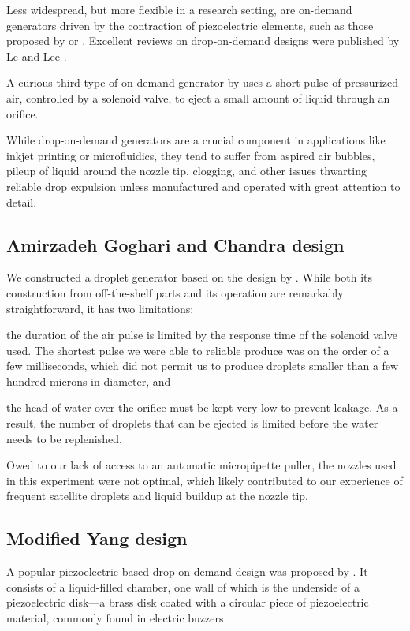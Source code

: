 \documentclass[11.5pt]{book}
\begin{document}
Less widespread, but more flexible in a research setting, are on-demand
generators driven by the contraction of piezoelectric elements, such as those
proposed by \citet{Yang97} or \citet{Ulmke99}. Excellent reviews on
drop-on-demand designs were published by Le and Lee \cite{Le98, Lee02}. 

A curious third type of on-demand generator by \citet{Goghari08} uses a short
pulse of pressurized air, controlled by a solenoid valve, to eject a small
amount of liquid through an orifice.

While drop-on-demand generators are a crucial component in applications like inkjet
printing or microfluidics, they tend to suffer from aspired air bubbles, pileup
of liquid around the nozzle tip, clogging, and other issues thwarting reliable
drop expulsion unless manufactured and operated with great attention to detail.

\subsection{Amirzadeh Goghari and Chandra design}
We constructed a droplet generator based on the design by \citet{Goghari08}.
While both its construction from off-the-shelf parts and its operation are
remarkably straightforward, it has two limitations:

\begin{alist}
    \item the duration of the air pulse is limited by the response time of the
        solenoid valve used. The shortest pulse we were able to reliable produce
        was on the order of a few milliseconds, which did not permit us to
        produce droplets smaller than a few hundred microns in diameter, and
    \item the head of water over the orifice must be kept very low to prevent 
        leakage. As a result, the number of droplets that can be ejected is
        limited before the water needs to be replenished.
\end{alist}

Owed to our lack of access to an automatic micropipette puller, the nozzles used
in this experiment were not optimal, which likely contributed to our experience
of frequent satellite droplets and liquid buildup at the nozzle tip.

\subsection{Modified Yang design}
A popular piezoelectric-based drop-on-demand design was proposed by
\citet{Yang97}. It consists of a liquid-filled chamber, one wall of which is the
underside of a piezoelectric disk---a brass disk coated with a circular piece of
piezoelectric material, commonly found in electric buzzers.
\end{document}
